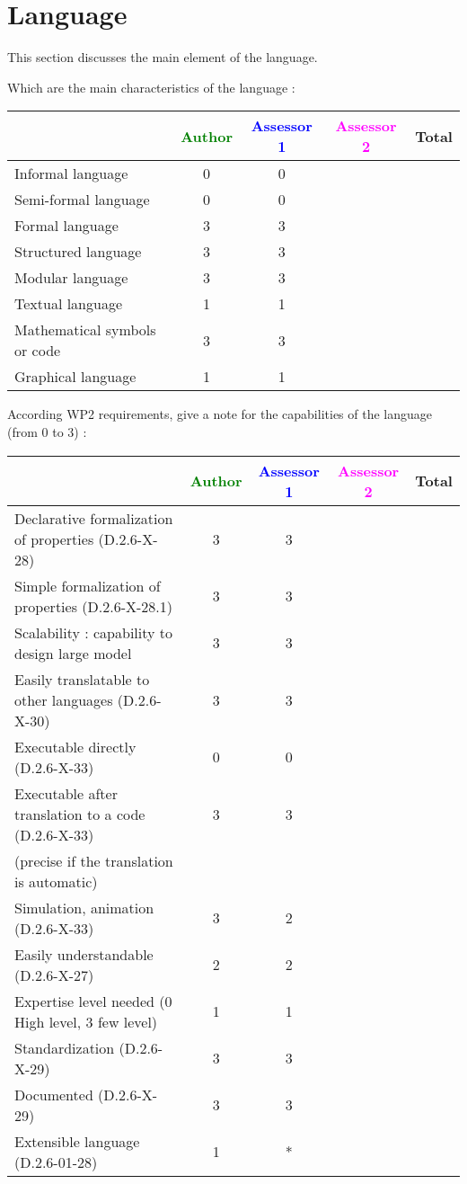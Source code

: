 \section{Language}
This section discusses the main element of the language.

Which are the main characteristics of the language :

\begin{tabular}{|l | c | c | c | c|}
\hline
& \textcolor{green}{Author} & \textcolor{blue}{Assessor 1} & \textcolor{magenta}{Assessor 2} & Total \\
\hline 
Informal language & 0 & 0 & &  \\
\hline 
Semi-formal language & 0 & 0 & &  \\
\hline
Formal language & 3 & 3 & &  \\
\hline
Structured language & 3 & 3 & & \\
\hline
Modular language & 3 & 3 & & \\
\hline
Textual language & 1 & 1& & \\
\hline
Mathematical symbols or code & 3 & 3 & & \\
\hline
Graphical language & 1 & 1 & & \\
\hline
\end{tabular}

According WP2 requirements, give a note for the capabilities of the language (from 0 to 3) :

\begin{tabular}{|l | c | c | c | c|}
\hline
& \textcolor{green}{Author} & \textcolor{blue}{Assessor 1} & \textcolor{magenta}{Assessor 2} & Total \\
\hline
Declarative formalization of properties (D.2.6-X-28) & 3 & 3 & & \\
\hline
Simple formalization of properties (D.2.6-X-28.1) & 3 & 3 & & \\
\hline
Scalability : capability to design large model & 3 & 3 & & \\
\hline
Easily translatable to other languages (D.2.6-X-30) & 3 & 3 & & \\
\hline
Executable directly (D.2.6-X-33) & 0 & 0 & & \\
\hline
Executable after translation to a code (D.2.6-X-33) & 3 & 3 & & \\
(precise if the translation is automatic) & & & & \\
\hline
Simulation, animation (D.2.6-X-33) &  3 & 2 & & \\
\hline
Easily understandable (D.2.6-X-27) & 2 & 2 & & \\
\hline
Expertise level needed (0 High level, 3 few level) &  1 & 1 & & \\
\hline
Standardization (D.2.6-X-29) & 3 & 3 & & \\
\hline
Documented (D.2.6-X-29) & 3 & 3 & & \\
\hline
Extensible language (D.2.6-01-28) & 1 & * & & \\
\hline
\end{tabular}


